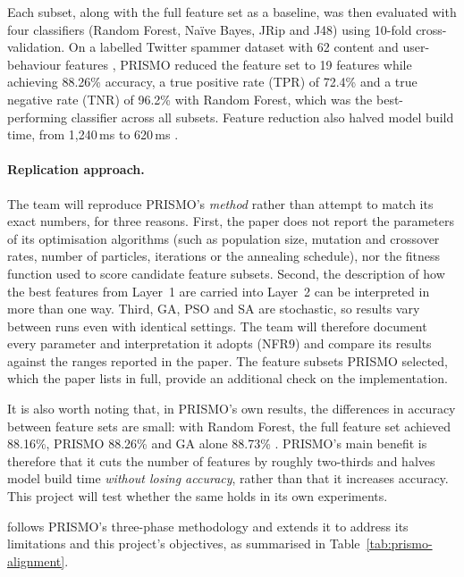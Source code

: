 Each subset, along with the full feature set as a baseline, was then evaluated with four classifiers (Random Forest, Na\"ive Bayes, JRip and J48) using 10-fold cross-validation. On a labelled Twitter spammer dataset with 62 content and user-behaviour features \parencite{benevenuto2010detecting}, PRISMO reduced the feature set to 19 features while achieving 88.26\% accuracy, a true positive rate (TPR) of 72.4\% and a true negative rate (TNR) of 96.2\% with Random Forest, which was the best-performing classifier across all subsets. Feature reduction also halved model build time, from 1,240\,ms to 620\,ms \parencite{agrawal2018prismo}.

\paragraph{Replication approach.} The team will reproduce PRISMO's \emph{method} rather than attempt to match its exact numbers, for three reasons. First, the paper does not report the parameters of its optimisation algorithms (such as population size, mutation and crossover rates, number of particles, iterations or the annealing schedule), nor the fitness function used to score candidate feature subsets. Second, the description of how the best features from Layer~1 are carried into Layer~2 can be interpreted in more than one way. Third, GA, PSO and SA are stochastic, so results vary between runs even with identical settings. The team will therefore document every parameter and interpretation it adopts (NFR9) and compare its results against the ranges reported in the paper. The feature subsets PRISMO selected, which the paper lists in full, provide an additional check on the implementation.

It is also worth noting that, in PRISMO's own results, the differences in accuracy between feature sets are small: with Random Forest, the full feature set achieved 88.16\%, PRISMO 88.26\% and GA alone 88.73\% \parencite{agrawal2018prismo}. PRISMO's main benefit is therefore that it cuts the number of features by roughly two-thirds and halves model build time \emph{without losing accuracy}, rather than that it increases accuracy. This project will test whether the same holds in its own experiments.

\projectname{} follows PRISMO's three-phase methodology and extends it to address its limitations and this project's objectives, as summarised in Table~\ref{tab:prismo-alignment}.

